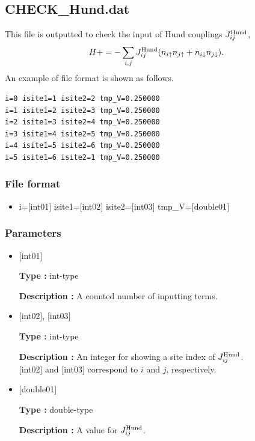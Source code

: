 \newpage
\subsection{CHECK\_Hund.dat}
This file is outputted to check the input of Hund couplings $J_{ij}^{\rm Hund}$,
\begin{align}
H += -\sum_{i,j}J_{ij}^{\rm Hund} (n_{i\uparrow}n_{j\uparrow}+n_{i\downarrow}n_{j\downarrow}).
\end{align}
An example of file format is shown as follows.

\begin{minipage}{12.5cm}
\begin{screen}
\begin{verbatim}
i=0 isite1=1 isite2=2 tmp_V=0.250000 
i=1 isite1=2 isite2=3 tmp_V=0.250000 
i=2 isite1=3 isite2=4 tmp_V=0.250000 
i=3 isite1=4 isite2=5 tmp_V=0.250000 
i=4 isite1=5 isite2=6 tmp_V=0.250000 
i=5 isite1=6 isite2=1 tmp_V=0.250000 
\end{verbatim}
\end{screen}
\end{minipage}

\subsubsection{File format}
 \begin{itemize}
   \item  i=$[$int01$]$ isite1=$[$int02$]$ isite2=$[$int03$]$ tmp\_V=$[$double01$]$ 
 \end{itemize}
 
\subsubsection{Parameters}
 \begin{itemize}

    \item  $[$int01$]$ 
   
    {\bf Type :} int-type

   {\bf Description :} A counted number of inputting terms. 
      
   \item  $[$int02$]$, $[$int03$]$
   
    {\bf Type :} int-type

    {\bf Description :}  An integer for showing a site index of $J_{ij}^{\rm Hund}$. \\
    $[$int02$]$ and $[$int03$]$ correspond to $i$ and $j$, respectively.
 
   \item  $[$double01$]$ 
   
    {\bf Type :} double-type

   {\bf Description :} A value for $J_{ij}^{\rm Hund}$.
\end{itemize}

